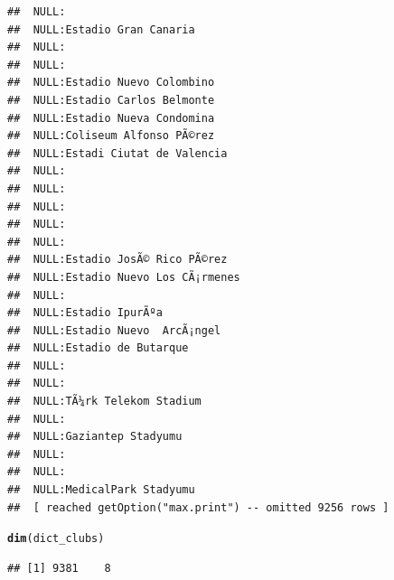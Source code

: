 \documentclass{article}\usepackage[]{graphicx}\usepackage[]{color}
\makeatletter
\newcommand{\hlstd}[1]{\textcolor[rgb]{0.345,0.345,0.345}{#1}}%
\newcommand{\hlkwd}[1]{\textcolor[rgb]{0.737,0.353,0.396}{\textbf{#1}}}%
\newenvironment{kframe}{%
 \def\at@end@of@kframe{}%
 \ifinner\ifhmode%
  \def\at@end@of@kframe{\end{minipage}}%
  \begin{minipage}{\columnwidth}%
 \fi\fi%
 \def\FrameCommand##1{\hskip\@totalleftmargin \hskip-\fboxsep
 \colorbox{shadecolor}{##1}\hskip-\fboxsep
     \hskip-\linewidth \hskip-\@totalleftmargin \hskip\columnwidth}%
 \MakeFramed {\advance\hsize-\width
   \@totalleftmargin\z@ \linewidth\hsize
   \@setminipage}}%
 {\par\unskip\endMakeFramed%
 \at@end@of@kframe}
\newenvironment{knitrout}{}{} %
\makeatother
\begin{document}
\begin{knitrout}
\begin{kframe}
\begin{verbatim}
##  NULL:                                                                       
##  NULL:Estadio Gran Canaria                                                   
##  NULL:                                                                       
##  NULL:                                                                       
##  NULL:Estadio Nuevo Colombino                                                
##  NULL:Estadio Carlos Belmonte                                                
##  NULL:Estadio Nueva Condomina                                                
##  NULL:Coliseum Alfonso PÃ©rez                                                
##  NULL:Estadi Ciutat de Valencia                                              
##  NULL:                                                                       
##  NULL:                                                                       
##  NULL:                                                                       
##  NULL:                                                                       
##  NULL:                                                                       
##  NULL:Estadio JosÃ© Rico PÃ©rez                                              
##  NULL:Estadio Nuevo Los CÃ¡rmenes                                            
##  NULL:                                                                       
##  NULL:Estadio IpurÃºa                                                        
##  NULL:Estadio Nuevo  ArcÃ¡ngel                                               
##  NULL:Estadio de Butarque                                                    
##  NULL:                                                                       
##  NULL:                                                                       
##  NULL:TÃ¼rk Telekom Stadium                                                  
##  NULL:                                                                       
##  NULL:Gaziantep Stadyumu                                                     
##  NULL:                                                                       
##  NULL:                                                                       
##  NULL:MedicalPark Stadyumu                                                   
##  [ reached getOption("max.print") -- omitted 9256 rows ]
\end{verbatim}
\begin{alltt}
\hlkwd{dim}\hlstd{(dict_clubs)}
\end{alltt}
\begin{verbatim}
## [1] 9381    8
\end{verbatim}

\end{kframe}
\end{knitrout}
\end{document}
